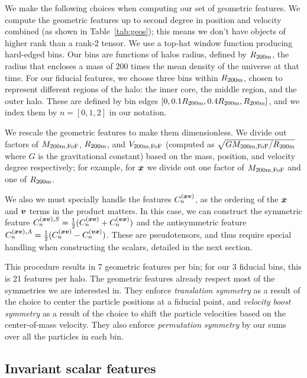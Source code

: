 We make the following choices when computing our set of geometric features.
We compute the geometric features up to second degree in position and velocity combined (as shown in Table~\ref{tab:geos}); this means we don't have objects of higher rank than a rank-2 tensor.
We use a top-hat window function producing hard-edged bins. 
Our bins are functions of halos radius, defined by $R_\mathrm{200m}$, the radius that encloses a mass of 200 times the mean density of the universe at that time.
For our fiducial features, we choose three bins within $R_\mathrm{200m}$, chosen to represent different regions of the halo: the inner core, the middle region, and the outer halo.
These are defined by bin edges $[0, 0.1R_\mathrm{200m}, 0.4R_\mathrm{200m}, R_\mathrm{200m}]$, and we index them by $n=[0,1,2]$ in our notation.

We rescale the geometric features to make them dimensionless.
We divide out factors of $M_\mathrm{200m,FoF}$, $R_\mathrm{200m}$, and $V_\mathrm{200m,FoF}$ (computed as $\sqrt{GM_\mathrm{200m,FoF}/R_\mathrm{200m}}$ where $G$ is the gravitational constant) based on the mass, position, and velocity degree respectively; for example, for $\bm{x}$ we divide out one factor of $M_\mathrm{200m,FoF}$ and one of $R_\mathrm{200m}$.

We also we must specially handle the features $C^{(\bm{x}\bm{v})}_n$, as the ordering of the $\bm{x}$ and $\bm{v}$ terms in the product matters.
In this case, we can construct the symmetric feature $ C^{(\bm{x}\bm{v}),S}_n = \frac{1}{2} (C^{(\bm{x}\bm{v})}_n + C^{(\bm{v}\bm{x})}_n)$ and the antisymmetric feature $C^{(\bm{x}\bm{v}),A}_n = \frac{1}{2} (C^{(\bm{x}\bm{v})}_n - C^{(\bm{v}\bm{x})}_n)$.
These are pseudotensors, and thus require special handling when constructing the scalars, detailed in the next section.

This procedure results in 7 geometric features per bin; for our 3 fiducial bins, this is 21 features per halo.
The geometric features already respect most of the symmetries we are interested in.
They enforce \emph{translation symmetry} as a result of the choice to center the particle positions at a fiducial point, and \emph{velocity boost symmetry} as a result of the choice to shift the particle velocities based on the center-of-mass velocity.  
They also enforce \emph{permutation symmetry} by our sums over all the particles in each bin.


\subsection{Invariant scalar features}
\label{sec:scalar_features}

